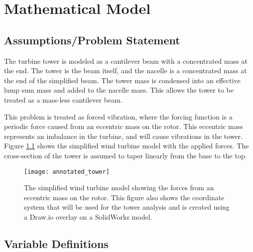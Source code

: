 \chapter{Mathematical Model} %

\label{ch_math_model}


\section{Assumptions/Problem Statement}

The turbine tower is modeled as a cantilever beam with a concentrated mass at the end.  The tower is the beam itself, and the nacelle is a concentrated mass at the end of the simplified beam.  The tower mass is condensed into an effective lump sum mass and added to the nacelle mass.  This allows the tower to be treated as a mass-less cantilever beam.

This problem is treated as forced vibration, where the forcing function is a periodic force caused from an eccentric mass on the rotor.  This eccentric mass represents an imbalance in the turbine, and will cause vibrations in the tower.   Figure \ref{fig:annotated_tower} shows the simplified wind turbine model with the applied forces. The cross-section of the tower is assumed to taper linearly from the base to the top.

\begin{figure}
	\centering
	\texttt{[image: annotated\_tower]}
	\decoRule
	\caption{The simplified wind turbine model showing the forces from an eccentric mass on the rotor.  This figure also shows the coordinate system that will be used for the tower analysis and is created using a Draw.io overlay on a SolidWorks model.}
	\label{fig:annotated_tower}
\end{figure}


\section{Variable Definitions}

